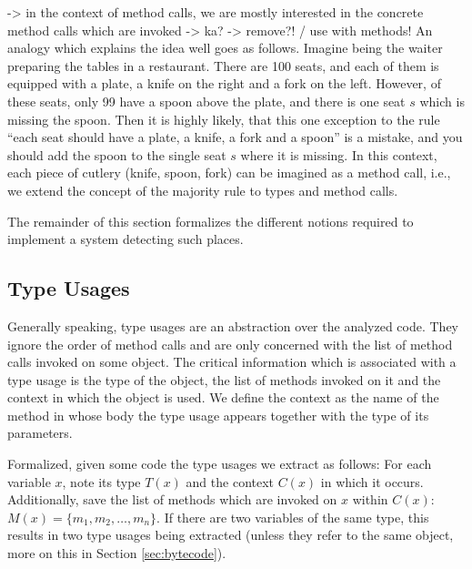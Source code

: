 -> in the context of method calls, we are mostly interested in the concrete method calls which are invoked -> ka?
-> remove?! / use with methods!
An analogy which explains the idea well goes as follows.
Imagine being the waiter preparing the tables in a restaurant.
There are 100 seats, and each of them is equipped with a plate, a knife on the right and a fork on the left.
However, of these seats, only 99 have a spoon above the plate, and there is one seat $s$ which is missing the spoon.
Then it is highly likely, that this one exception to the rule ``each seat should have a plate, a knife, a fork and a spoon'' is a mistake, and you should add the spoon to the single seat $s$ where it is missing.
In this context, each piece of cutlery (knife, spoon, fork) can be imagined as a method call, i.e., we extend the concept of the majority rule to types and method calls.

The remainder of this section formalizes the different notions required to implement a system detecting such places.

\subsection{Type Usages}

Generally speaking, type usages are an abstraction over the analyzed code.
They ignore the order of method calls and are only concerned with the list of method calls invoked on some object.
The critical information which is associated with a type usage is the type of the object, the list of methods invoked on it and the context in which the object is used.
We define the context as the name of the method in whose body the type usage appears together with the type of its parameters.

Formalized, given some code the type usages we extract as follows:
For each variable $x$, note its type $T(x)$ and the context $C(x)$ in which it occurs.
Additionally, save the list of methods which are invoked on $x$ within $C(x)$: $M(x) =\{ m_1, m_2, \dotsc, m_n\}$.
If there are two variables of the same type, this results in two type usages being extracted (unless they refer to the same object, more on this in Section \ref{sec:bytecode}).

